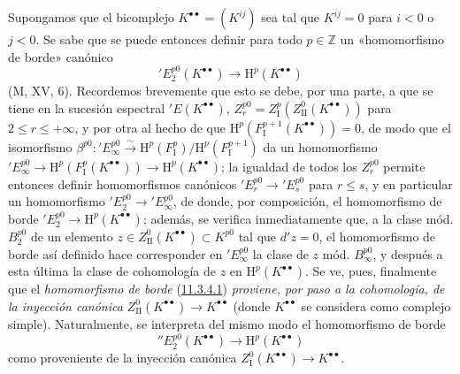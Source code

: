 \begin{env}[11.3.4]
\label{0.11.3.4-fr}
Supongamos que el bicomplejo $K^{\bullet\bullet}=(K^{ij})$ sea tal que $K^{ij}=0$ para $i<0$ o $j<0$. Se sabe que se puede entonces definir para todo $p\in\mathbb Z$ un «homomorfismo de borde» canónico
\[
\label{0.11.3.4.1-fr}
  'E_2^{p0}(K^{\bullet\bullet})\longrightarrow
  \mathrm H^p(K^{\bullet\bullet})
  \tag{11.3.4.1}
\]
(M, XV, 6). Recordemos brevemente que esto se debe, por una parte, a que se tiene en la sucesión espectral $'E(K^{\bullet\bullet})$, $Z_r^{p0}=Z_{\mathrm I}^p(Z_{\mathrm{II}}^0(K^{\bullet\bullet}))$ para $2\leq r\leq+\infty$, y por otra al hecho de que $\mathrm H^p(F_{\mathrm I}^{p+1}(K^{\bullet\bullet}))=0$, de modo que el isomorfismo $\beta^{p0}:'E_\infty^{p0}\xrightarrow{\sim}
\mathrm H^p(F_{\mathrm I}^p)/\mathrm H^p(F_{\mathrm I}^{p+1})$ da un homomorfismo $'E_\infty^{p0}\to\mathrm H^p(F_{\mathrm I}^p(K^{\bullet\bullet}))
\to\mathrm H^p(K^{\bullet\bullet})$; la igualdad de todos los $Z_r^{p0}$ permite entonces definir homomorfismos canónicos $'E_r^{p0}\to'E_s^{p0}$ para $r\leq s$, y en particular un homomorfismo $'E_2^{p0}\to'E_\infty^{p0}$, de donde, por composición, el homomorfismo de borde $'E_2^{p0}\to\mathrm H^p(K^{\bullet\bullet})$; además, se verifica inmediatamente que, a la clase mód. $B_2^{p0}$ de un elemento $z\in Z_{\mathrm{II}}^0(K^{\bullet\bullet})\subset K^{p0}$ tal que $d'z=0$, el homomorfismo de borde así definido hace corresponder en $'E_\infty^{p0}$ la clase de $z$ mód. $B_\infty^{p0}$, y después a esta última la clase de cohomología de $z$ en $\mathrm H^p(K^{\bullet\bullet})$. Se ve, pues, finalmente que el \emph{homomorfismo de borde} (\hyperref[0.11.3.4.1-fr]{11.3.4.1}) \emph{proviene, por paso a la cohomología, de la inyección canónica} $Z_{\mathrm{II}}^0(K^{\bullet\bullet})\to K^{\bullet\bullet}$ (donde $K^{\bullet\bullet}$ se considera como complejo simple). Naturalmente, se interpreta del mismo modo el homomorfismo de borde
\[
\label{0.11.3.4.2-fr}
  ''E_2^{p0}(K^{\bullet\bullet})\longrightarrow
  \mathrm H^p(K^{\bullet\bullet})
  \tag{11.3.4.2}
\]
como proveniente de la inyección canónica $Z_{\mathrm I}^0(K^{\bullet\bullet})\to K^{\bullet\bullet}$.
\end{env}

